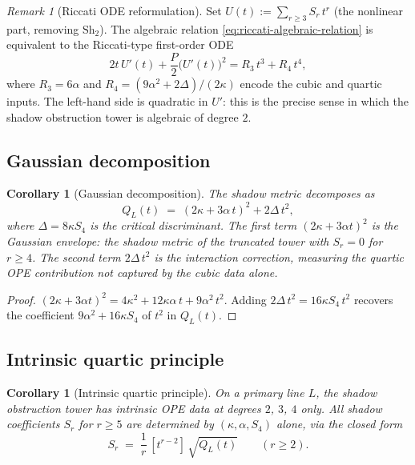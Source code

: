 \documentclass[11pt]{article}
\theoremstyle{plain}
\newtheorem{corollary}[theorem]{Corollary}
\theoremstyle{definition}
\theoremstyle{remark}
\newtheorem{remark}[theorem]{Remark}
\begin{document}
\begin{remark}[Riccati ODE reformulation]
\label{rem:riccati-ode}
Set $U(t) := \sum_{r \geq 3} S_r \, t^r$ (the nonlinear part,
removing $\mathrm{Sh}_2$). The algebraic relation
\eqref{eq:riccati-algebraic-relation} is equivalent to the
Riccati-type first-order ODE
\begin{equation}
\label{eq:riccati-ode}
 2t\,U'(t) + \frac{P}{2}\bigl(U'(t)\bigr)^2
 = R_3\,t^3 + R_4\,t^4,
\end{equation}
where $R_3 = 6\alpha$ and
$R_4 = (9\alpha^2 + 2\Delta)/(2\kappa)$ encode the cubic
and quartic inputs. The left-hand side is quadratic in $U'$:
this is the precise sense in which the shadow obstruction tower is algebraic
of degree $2$.
\end{remark}

\subsection{Gaussian decomposition}

\begin{corollary}[Gaussian decomposition]
\label{cor:gaussian-decomposition}
The shadow metric decomposes as
\begin{equation}
\label{eq:gaussian-decomposition}
 Q_L(t) \;=\; (2\kappa + 3\alpha\,t)^2 + 2\Delta\,t^2,
\end{equation}
where $\Delta = 8\kappa S_4$ is the critical discriminant.
The first term $(2\kappa + 3\alpha t)^2$ is the \emph{Gaussian
envelope}: the shadow metric of the truncated tower with
$S_r = 0$ for $r \geq 4$. The second term $2\Delta\,t^2$
is the \emph{interaction correction}, measuring the quartic
OPE contribution not captured by the cubic data alone.
\end{corollary}

\begin{proof}
$(2\kappa + 3\alpha t)^2 = 4\kappa^2 + 12\kappa\alpha\,t
+ 9\alpha^2\,t^2$. Adding $2\Delta\,t^2 = 16\kappa S_4\,t^2$
recovers the coefficient $9\alpha^2 + 16\kappa S_4$ of $t^2$
in $Q_L(t)$.
\end{proof}

\subsection{Intrinsic quartic principle}

\begin{corollary}[Intrinsic quartic principle]
\label{cor:intrinsic-quartic}
On a primary line $L$, the shadow obstruction tower has intrinsic OPE data
at degrees $2$, $3$, $4$ only. All shadow coefficients $S_r$
for $r \geq 5$ are determined by $(\kappa, \alpha, S_4)$
alone, via the closed form
\begin{equation}
\label{eq:shadow-from-closed-form}
 S_r \;=\; \frac{1}{r}\,[t^{r-2}]\,\sqrt{Q_L(t)}
 \qquad (r \geq 2).
\end{equation}
\end{corollary}
\end{document}
